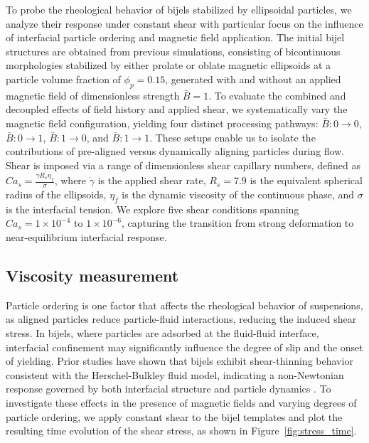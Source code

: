 To probe the rheological behavior of bijels stabilized by ellipsoidal particles, we analyze their response under constant shear with particular focus on the influence of interfacial particle ordering 
and magnetic field application. The initial bijel structures are obtained from previous simulations, consisting of bicontinuous morphologies stabilized by either prolate or oblate magnetic 
ellipsoids at a particle volume fraction of $\phi_p = 0.15$, generated with and without an applied magnetic field of dimensionless strength $\bar{B} = 1$. To evaluate the combined and decoupled effects 
of field history and applied shear, we systematically vary the magnetic field configuration, yielding four distinct processing pathways: 
$\bar{B}:0 \rightarrow 0$, $\bar{B}:0 \rightarrow 1$, $\bar{B}:1 \rightarrow 0$, and $\bar{B}:1 \rightarrow 1$. These setups enable us to isolate the contributions of pre-aligned versus dynamically aligning 
particles during flow. Shear is imposed via a range of dimensionless shear capillary numbers, defined as $Ca_s = \frac{\dot{\gamma} R_s \eta_f}{\sigma}$, where $\dot{\gamma}$ is the applied shear rate, 
$R_s = 7.9$ is the equivalent spherical radius of the ellipsoids, $\eta_f$ is the dynamic viscosity of the continuous phase, and $\sigma$ is the interfacial tension. 
\cite{frijters_effects_2012, yang_capillary_2022} We explore five shear conditions spanning $Ca_s = 1 \times 10^{-4}$ to $1 \times 10^{-6}$, capturing the transition from strong deformation to 
near-equilibrium interfacial response.

\subsection{Viscosity measurement}

Particle ordering is one factor that affects the rheological behavior of suspensions, as aligned particles reduce particle-fluid interactions, reducing the
induced shear stress. In bijels, where particles are adsorbed at the fluid-fluid interface, interfacial confinement may significantly 
influence the degree of slip and the onset of yielding. Prior studies have shown that bijels exhibit shear-thinning behavior consistent with the Herschel-Bulkley fluid model, 
indicating a non-Newtonian response governed by both interfacial structure and particle dynamics \cite{macmillan_rheological_2019}. To investigate these effects in 
the presence of magnetic fields and varying degrees of particle ordering, we apply constant shear to the bijel templates and plot the resulting time evolution of 
the shear stress, as shown in Figure~\ref{fig:stress_time}.

